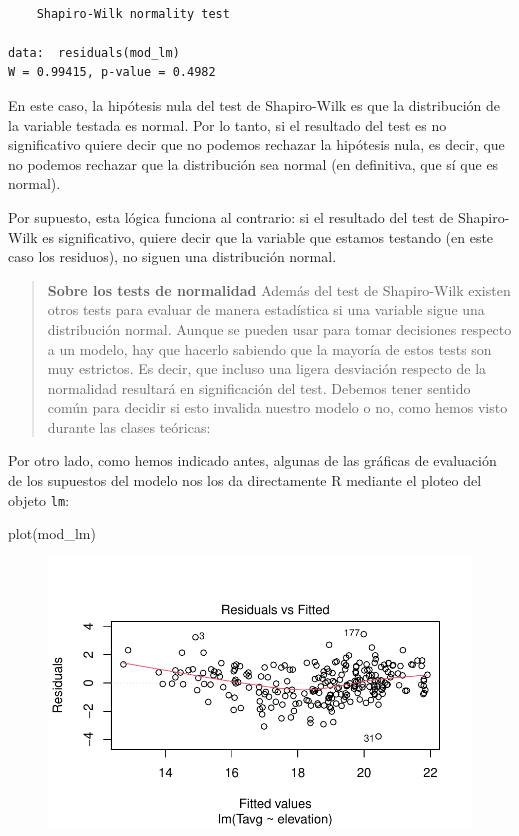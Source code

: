 \documentclass[
  letterpaper,
  DIV=11,
  numbers=noendperiod]{scrreprt}
\newenvironment{Shaded}{\begin{snugshade}}{\end{snugshade}}
\newcommand{\FunctionTok}[1]{\textcolor[rgb]{0.28,0.35,0.67}{#1}}
\newcommand{\NormalTok}[1]{\textcolor[rgb]{0.00,0.23,0.31}{#1}}
\begin{document}
\begin{verbatim}

    Shapiro-Wilk normality test

data:  residuals(mod_lm)
W = 0.99415, p-value = 0.4982
\end{verbatim}

En este caso, la hipótesis nula del test de Shapiro-Wilk es que la
distribución de la variable testada es normal. Por lo tanto, si el
resultado del test es no significativo quiere decir que no podemos
rechazar la hipótesis nula, es decir, que no podemos rechazar que la
distribución sea normal (en definitiva, que sí que es normal).

Por supuesto, esta lógica funciona al contrario: si el resultado del
test de Shapiro-Wilk es significativo, quiere decir que la variable que
estamos testando (en este caso los residuos), no siguen una distribución
normal.

\begin{quote}
\textbf{Sobre los tests de normalidad} Además del test de Shapiro-Wilk
existen otros tests para evaluar de manera estadística si una variable
sigue una distribución normal. Aunque se pueden usar para tomar
decisiones respecto a un modelo, hay que hacerlo sabiendo que la mayoría
de estos tests son muy estrictos. Es decir, que incluso una ligera
desviación respecto de la normalidad resultará en significación del
test. Debemos tener sentido común para decidir si esto invalida nuestro
modelo o no, como hemos visto durante las clases teóricas:
\end{quote}

Por otro lado, como hemos indicado antes, algunas de las gráficas de
evaluación de los supuestos del modelo nos los da directamente R
mediante el ploteo del objeto \texttt{lm}:

\begin{Shaded}
\begin{Highlighting}[]
\FunctionTok{plot}\NormalTok{(mod\_lm)}
\end{Highlighting}
\end{Shaded}

\begin{figure}[H]

{\centering \includegraphics{01_RegresionLineal_files/figure-pdf/unnamed-chunk-36-1.pdf}

}

\end{figure}
\end{document}
